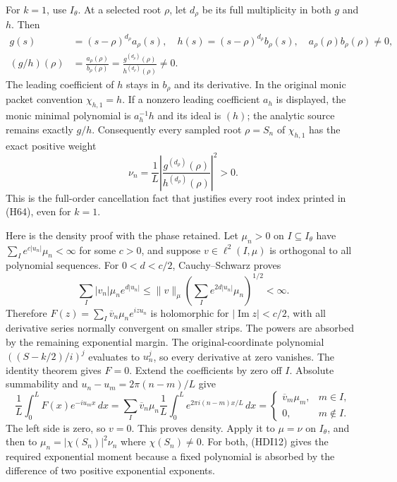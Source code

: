 For \(k=1\), use \(I_\theta\). At a selected root \(\rho\), let
\(d_\rho\) be its full multiplicity in both \(g\) and \(h\). Then
\[
 \begin{split}
 g(s)&=(s-\rho)^{d_\rho}a_\rho(s),\quad
 h(s)=(s-\rho)^{d_\rho}b_\rho(s),\quad
 a_\rho(\rho)b_\rho(\rho)\ne0,\\
 (g/h)(\rho)&=\frac{a_\rho(\rho)}{b_\rho(\rho)}
 =\frac{g^{(d_\rho)}(\rho)}{h^{(d_\rho)}(\rho)}\ne0.
 \end{split}
 \tag{HDI13}
\]
The leading coefficient of \(h\) stays in \(b_\rho\) and its
derivative. In the original monic packet convention
\(\chi_{h,1}=h\). If a nonzero leading coefficient \(a_h\) is
displayed, the monic minimal polynomial is \(a_h^{-1}h\) and its
ideal is \((h)\); the analytic source remains exactly \(g/h\).
Consequently every sampled root \(\rho=S_n\) of \(\chi_{h,1}\)
has the exact positive weight
\[
 \nu_n=\frac1L
 \left|\frac{g^{(d_\rho)}(\rho)}{h^{(d_\rho)}(\rho)}\right|^2>0.
 \tag{HDI14}
\]
This is the full-order cancellation fact that justifies every
root index printed in (H64), even for \(k=1\).

Here is the density proof with the phase retained. Let
\(\mu_n>0\) on \(I\subseteq I_\theta\) have
\(\sum_Ie^{c|u_n|}\mu_n<\infty\) for some \(c>0\), and suppose
\(v\in\ell^2(I,\mu)\) is orthogonal to all polynomial sequences.
For \(0<d<c/2\), Cauchy--Schwarz proves
\[
 \sum_I|v_n|\mu_ne^{d|u_n|}
 \le\|v\|_\mu\left(\sum_Ie^{2d|u_n|}\mu_n\right)^{1/2}<\infty.
 \tag{HDI15}
\]
Therefore \(F(z)=\sum_I\overline v_n\mu_ne^{izu_n}\) is
holomorphic for \(|\operatorname{Im}z|<c/2\), with all
derivative series normally convergent on smaller strips.
The powers are absorbed by the remaining exponential margin.
The original-coordinate polynomial \(((S-k/2)/i)^j\) evaluates
to \(u_n^j\), so every derivative at zero vanishes. The identity
theorem gives \(F=0\). Extend the coefficients by zero off \(I\).
Absolute summability and \(u_n-u_m=2\pi(n-m)/L\) give
\[
 \frac1L\int_0^L F(x)e^{-iu_mx}\,dx
 =\sum_I\overline v_n\mu_n
 \frac1L\int_0^L e^{2\pi i(n-m)x/L}\,dx
 =\begin{cases}\overline v_m\mu_m,&m\in I,\\0,&m\notin I.\end{cases}
 \tag{HDI16}
\]
The left side is zero, so \(v=0\). This proves density.
Apply it to \(\mu=\nu\) on \(I_\theta\), and then to
\(\mu_n=|\chi(S_n)|^2\nu_n\) where \(\chi(S_n)\ne0\).
For both, (HDI12) gives the required exponential moment because
a fixed polynomial is absorbed by the difference of two
positive exponential exponents.

